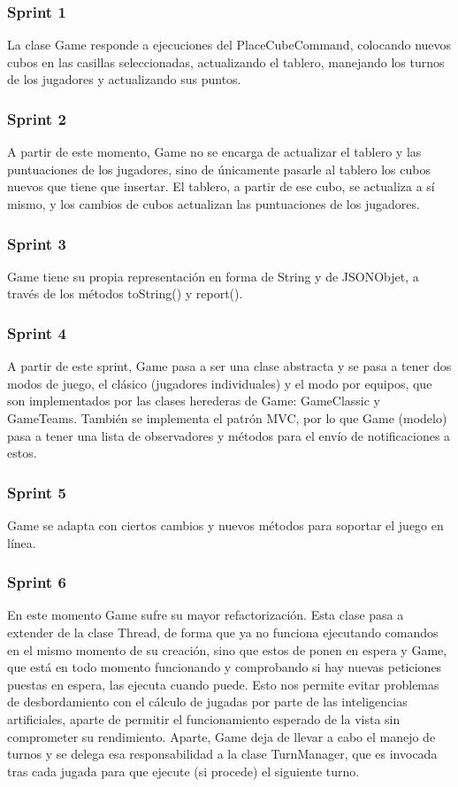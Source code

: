 \documentclass{article}
\theoremstyle{break}
\begin{document}
\subsubsection{Sprint 1}
La clase Game responde a ejecuciones del PlaceCubeCommand, colocando nuevos cubos en las casillas seleccionadas, actualizando el tablero, manejando los turnos de los jugadores y actualizando sus puntos.
\subsubsection{Sprint 2}
A partir de este momento, Game no se encarga de actualizar el tablero y las puntuaciones de los jugadores, sino de únicamente pasarle al tablero los cubos nuevos que tiene que insertar. El tablero, a partir de ese cubo, se actualiza a sí mismo, y los cambios de cubos actualizan las puntuaciones de los jugadores.
\subsubsection{Sprint 3}
Game tiene su propia representación en forma de String y de JSONObjet, a través de los métodos toString() y report().
\subsubsection{Sprint 4}
A partir de este sprint, Game pasa a ser una clase abstracta y se pasa a tener dos modos de juego, el clásico (jugadores individuales) y el modo por equipos, que son implementados por las clases herederas de Game: GameClassic y GameTeams.
También se implementa el patrón MVC, por lo que Game (modelo) pasa a tener una lista de observadores y métodos para el envío de notificaciones a estos.
\subsubsection{Sprint 5}
Game se adapta con ciertos cambios y nuevos métodos para soportar el juego en línea.
\subsubsection{Sprint 6}
En este momento Game sufre su mayor refactorización. Esta clase pasa a extender de la clase Thread, de forma que ya no funciona ejecutando comandos en el mismo momento de su creación, sino que estos de ponen en espera y Game, que está en todo momento funcionando y comprobando si hay nuevas peticiones puestas en espera, las ejecuta cuando puede. Esto nos permite evitar problemas de desbordamiento con el cálculo de jugadas por parte de las inteligencias artificiales, aparte de permitir el funcionamiento esperado de la vista sin comprometer su rendimiento.
Aparte, Game deja de llevar a cabo el manejo de turnos y se delega esa responsabilidad a la clase TurnManager, que es invocada tras cada jugada para que ejecute (si procede) el siguiente turno.
\end{document}
